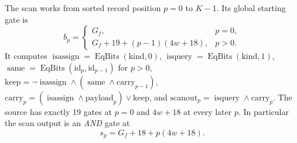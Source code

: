 \documentclass[11pt]{article}
\begin{document}
The scan works from sorted record position $p=0$ to $K-1$.
Its global starting gate is
\[
b_p=\begin{cases}G_f,&p=0,\\
G_f+19+(p-1)(4w+18),&p>0.
\end{cases}                                                   \tag{3}
\]
It computes 
$\operatorname{isassign}=\operatorname{EqBits}(\mathrm{kind},0)$,
$\operatorname{isquery}=\operatorname{EqBits}(\mathrm{kind},1)$,
$\operatorname{same}=\operatorname{EqBits}(\mathrm{id}_p,
\mathrm{id}_{p-1})$ for $p>0$,
$\mathrm{keep}=\neg\operatorname{isassign}\wedge
  (\operatorname{same}\wedge\mathrm{carry}_{p-1})$,
$\mathrm{carry}_p=(\operatorname{isassign}\wedge\mathrm{payload}_p)
\vee\mathrm{keep}$, and
$\mathrm{scanout}_p=\operatorname{isquery}\wedge\mathrm{carry}_p$.
The source has exactly 19 gates at $p=0$ and $4w+18$ at every
later $p$. In particular the scan output is an \emph{AND} gate
at
\[
                 s_p=G_f+18+p(4w+18).                       \tag{4}
\]
\end{document}
